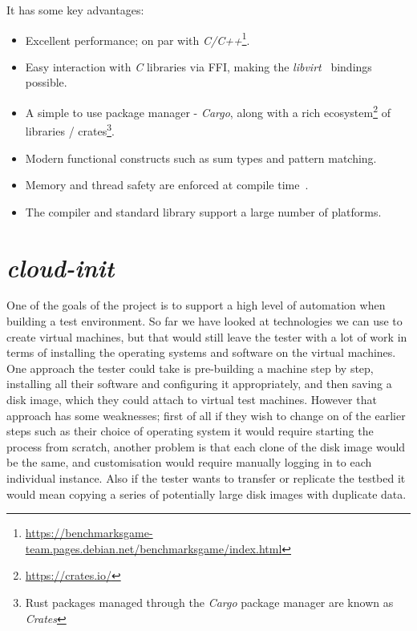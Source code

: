 \documentclass[
    author={Jacob Daniel Halsey},
    supervisor={Prof. Awais Rashid},
    degree={BSc},
    title={Building a Testbed for Evaluating Privacy Enhancing Technologies  (PETs)},
    subtitle={},
    type={software development},
    year={2021}
]{dissertation}
\begin{document}
\begin{singlespace}
	It has some key advantages:
	\begin{itemize}
		\item Excellent performance; on par with
		 \emph{C/C++}\footnote{\url{https://benchmarksgame-team.pages.debian.net/benchmarksgame/index.html}}.
		\item Easy interaction with \emph{C} libraries via FFI, making 
		the \emph{libvirt}~\cite{libvirt_rust} bindings possible.
		\item A simple to use package manager - \emph{Cargo},
		along with a rich ecosystem\footnote{\url{https://crates.io/}} of 
		libraries / crates\footnote{Rust packages 
			managed through the \emph{Cargo} package
				manager are known as \emph{Crates}}.
		\item Modern functional constructs such as sum types and pattern matching.
		\item Memory and thread safety are enforced at compile time~\cite{systems_rust}.
		\item The compiler and standard library support a large number of platforms.
	\end{itemize}
\end{singlespace}

\section{\emph{cloud-init}}
\label{sect:cloud-init-background}

One of the goals of the project is to support a high level of automation when building a 
test environment. So far we have looked at technologies we can use to create virtual machines,
but that would still leave the tester with a lot of work in terms of installing the operating
systems and software on the virtual machines. \\

One approach the tester could take is pre-building a machine step by step,
installing all their software and configuring it appropriately, and then saving
a disk image, which they could attach to virtual test machines. However that approach 
has some weaknesses; first of all if they wish to change on of the earlier steps
such as their choice of operating system it would require starting the process from scratch,
another problem is that each clone of the disk image would be the same, and customisation
would require manually logging in to each individual instance.
Also if the tester wants to transfer or replicate the testbed it would mean copying
a series of potentially large disk images with duplicate data. \\
\end{document}
